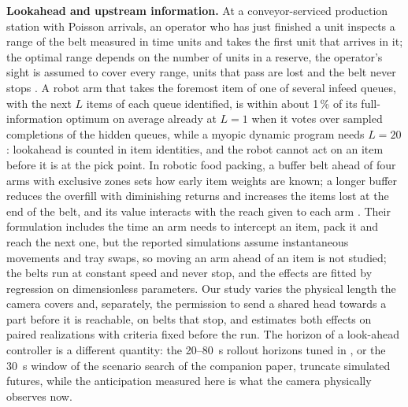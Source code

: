 \documentclass[11pt,a4paper]{article}
\begin{document}
\textbf{Lookahead and upstream information.} At a conveyor-serviced production station
with Poisson arrivals, an operator who has just finished a unit inspects a range of the
belt measured in time units and takes the first unit that arrives in it; the optimal range
depends on the number of units in a reserve, the operator's sight is assumed to cover every
range, units that pass are lost and the belt never stops \cite{Nawijn1981}. A robot arm that
takes the foremost item of one of several infeed queues, with the next $L$ items of each
queue identified, is within about 1\,\% of its full-information optimum on average already
at $L=1$ when it
votes over sampled completions of the hidden queues, while a myopic dynamic program needs
$L=20$ \cite{Li2026}: lookahead is counted in item identities, and the robot cannot act on
an item before it is at the pick point. In robotic food packing, a buffer belt ahead of
four arms with exclusive zones sets how early item weights are known; a longer buffer
reduces the overfill with diminishing returns and increases the items lost at the end of
the belt, and its value interacts with the reach given to each arm \cite{Ladefoged2026}.
Their formulation includes the time an arm needs to intercept an item, pack it and reach
the next one, but the reported simulations assume instantaneous movements and tray swaps,
so moving an arm ahead of an item is not studied; the belts run at constant speed and never
stop, and the effects are fitted by regression on dimensionless parameters. Our study
varies the physical length the camera covers and, separately, the permission to send a
shared head towards a part before it is reachable, on belts that stop, and estimates both
effects on paired realizations with criteria fixed before the run. The horizon of a
look-ahead controller is a different quantity: the 20--80~s rollout horizons tuned in
\cite{Righettini2025}, or the 30~s window of the scenario search of the companion paper,
truncate simulated futures, while the anticipation measured here is what the camera
physically observes now.
\end{document}
